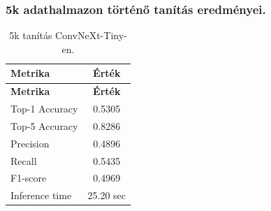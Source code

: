 \subsubsection{5k adathalmazon történő tanítás eredményei.}
  \begin{center}
    \begin{longtable}{l c}
    \caption{5k tanítás ConvNeXt-Tiny-en.} \label{tab:phase03_ConvNeXt-Tiny_5k} \\
    \toprule
    \textbf{Metrika} & \textbf{Érték} \\
    \midrule
    \endfirsthead
    \toprule
    \textbf{Metrika} & \textbf{Érték} \\
    \midrule
    \endhead
    Top-1 Accuracy & 0.5305 \\
    Top-5 Accuracy & 0.8286 \\
    Precision      & 0.4896 \\
    Recall         & 0.5435 \\
    F1-score       & 0.4969 \\
    Inference time & 25.20 sec \\
    \bottomrule
    \end{longtable}
  \end{center}

